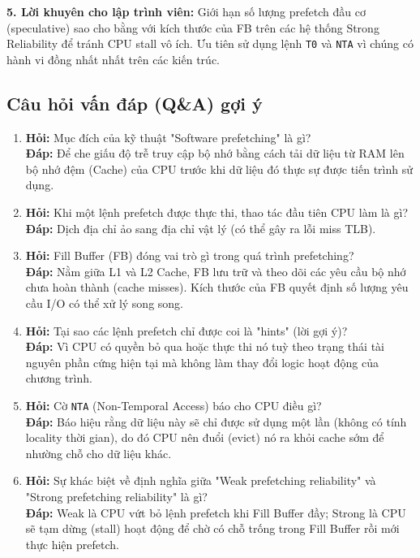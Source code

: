\documentclass[12pt,a4paper]{article}
\begin{document}
\textbf{5. Lời khuyên cho lập trình viên:}
Giới hạn số lượng prefetch đầu cơ (speculative) sao cho bằng với kích thước của FB trên các hệ thống Strong Reliability để tránh CPU stall vô ích. Ưu tiên sử dụng lệnh \texttt{T0} và \texttt{NTA} vì chúng có hành vi đồng nhất nhất trên các kiến trúc.

\subsection{Câu hỏi vấn đáp (Q\&A) gợi ý}

\begin{enumerate}
    \item \textbf{Hỏi:} Mục đích của kỹ thuật "Software prefetching" là gì? \\
    \textbf{Đáp:} Để che giấu độ trễ truy cập bộ nhớ bằng cách tải dữ liệu từ RAM lên bộ nhớ đệm (Cache) của CPU trước khi dữ liệu đó thực sự được tiến trình sử dụng.
    
    \item \textbf{Hỏi:} Khi một lệnh prefetch được thực thi, thao tác đầu tiên CPU làm là gì? \\
    \textbf{Đáp:} Dịch địa chỉ ảo sang địa chỉ vật lý (có thể gây ra lỗi miss TLB).
    
    \item \textbf{Hỏi:} Fill Buffer (FB) đóng vai trò gì trong quá trình prefetching? \\
    \textbf{Đáp:} Nằm giữa L1 và L2 Cache, FB lưu trữ và theo dõi các yêu cầu bộ nhớ chưa hoàn thành (cache misses). Kích thước của FB quyết định số lượng yêu cầu I/O có thể xử lý song song.
    
    \item \textbf{Hỏi:} Tại sao các lệnh prefetch chỉ được coi là "hints" (lời gợi ý)? \\
    \textbf{Đáp:} Vì CPU có quyền bỏ qua hoặc thực thi nó tuỳ theo trạng thái tài nguyên phần cứng hiện tại mà không làm thay đổi logic hoạt động của chương trình.
    
    \item \textbf{Hỏi:} Cờ \texttt{NTA} (Non-Temporal Access) báo cho CPU điều gì? \\
    \textbf{Đáp:} Báo hiệu rằng dữ liệu này sẽ chỉ được sử dụng một lần (không có tính locality thời gian), do đó CPU nên đuổi (evict) nó ra khỏi cache sớm để nhường chỗ cho dữ liệu khác.
    
    \item \textbf{Hỏi:} Sự khác biệt về định nghĩa giữa "Weak prefetching reliability" và "Strong prefetching reliability" là gì? \\
    \textbf{Đáp:} Weak là CPU vứt bỏ lệnh prefetch khi Fill Buffer đầy; Strong là CPU sẽ tạm dừng (stall) hoạt động để chờ có chỗ trống trong Fill Buffer rồi mới thực hiện prefetch.
    

\end{enumerate}
\end{document}
